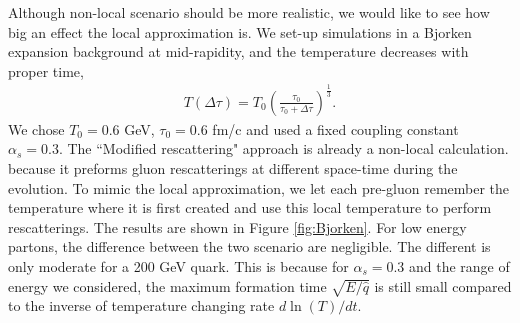 \documentclass[aps, prc, reprint, amsmath, groupedaddress, nofootinbib]{revtex4-1}
\begin{document}
Although non-local scenario should be more realistic, we would like to see how big an effect the local approximation is.
We set-up simulations in a Bjorken expansion background at mid-rapidity, and the temperature decreases with proper time,
\begin{eqnarray}
T(\Delta\tau) = T_0 \left(\frac{\tau_0}{\tau_0+\Delta\tau}\right)^{\frac{1}{3}}.
\end{eqnarray}
We chose $T_0=0.6$ GeV, $\tau_0=0.6$ fm/c and used a fixed coupling constant $\alpha_s = 0.3$.
The ``Modified rescattering" approach is already a non-local calculation. because it preforms gluon rescatterings at different space-time during the evolution. 
To mimic the local approximation, we let each pre-gluon remember the temperature where it is first created and use this local temperature to perform rescatterings.
The results are shown in Figure \ref{fig:Bjorken}. 
For low energy partons, the difference between the two scenario are negligible. The different is only moderate for a 200 GeV quark.
This is because for $\alpha_s = 0.3$ and the range of energy we considered, the maximum formation time $\sqrt{E/\hat{q}}$ is still small compared to the inverse of temperature changing rate $d\ln(T)/dt$.
\end{document}
